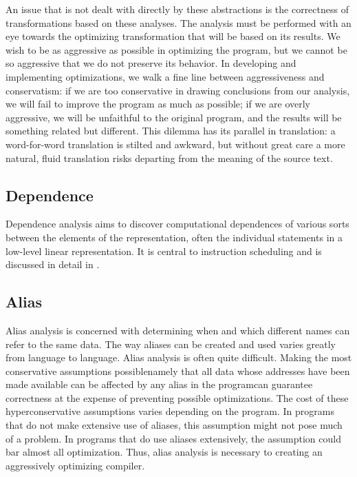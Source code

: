 An issue that is not dealt with directly by these abstractions is the correctness of transformations based on these analyses. The analysis must be performed with an eye towards the optimizing transformation that will be based on its results. We wish to be as aggressive as possible in optimizing the program, but we cannot be so aggressive that we do not preserve its behavior. In developing and implementing optimizations, we walk a fine line between aggressiveness and conservatism: if we are too conservative in drawing conclusions from our analysis, we will fail to improve the program as much as possible; if we are overly aggressive, we will be unfaithful to the original program, and the results will be something related but different. This dilemma has its parallel in translation: a word-for-word translation is stilted and awkward, but without great care a more natural, fluid translation risks departing from the meaning of the source text.%

\subsection{Dependence}
Dependence analysis aims to discover computational dependences of various sorts between the elements of the representation, often the individual statements in a low-level linear representation. It is central to instruction scheduling and is discussed in detail in .

\subsection{Alias}
Alias analysis is concerned with determining when and which different names can refer to the same data. The way aliases can be created and used varies greatly from language to language. Alias analysis is often quite difficult. Making the most conservative assumptions possible\empause namely that all data whose addresses have been made available can be affected by any alias in the program\empause can guarantee correctness at the expense of preventing possible optimizations. The cost of these hyperconservative assumptions varies depending on the program. In programs that do not make extensive use of aliases, this assumption might not pose much of a problem. In programs that do use aliases extensively, the assumption could bar almost all optimization. Thus, alias analysis is necessary to creating an aggressively optimizing compiler.

